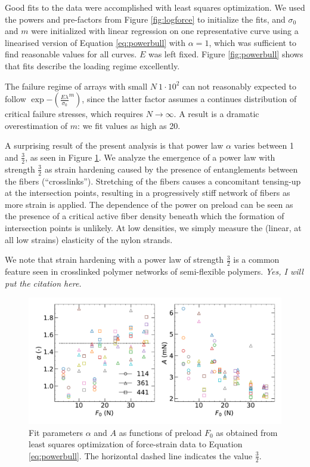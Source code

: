 \documentclass{article}
\begin{document}
Good fits to the data were accomplished with least squares optimization. We used the
powers and pre-factors from Figure \ref{fig:logforce} to initialize the fits, and $\sigma_0$ 
and $m$ were initialized with linear regression on one representative curve using a linearised
version of Equation \ref{eq:powerbull} with $\alpha=1$, which was sufficient to find 
reasonable values for all curves. $E$ was left fixed.  Figure \ref{fig:powerbull} shows that fits
describe the loading regime excellently. 

The failure regime of arrays with small $N~1\cdot10^2$ can not reasonably expected to follow
$\exp{-(\frac{E\lambda}{\sigma_0}^m)}$, since the latter factor assumes a continues distribution 
of critical failure stresses, which requires $N \to \infty$. A result is a dramatic overestimation
of $m$: we fit values as high as 20. 

A surprising result of the present analysis is that power law $\alpha$ varies between 
1 and $\frac{3}{2}$, as seen in Figure \ref{fig:fitpars}. We analyze the emergence 
of a power law with strength $\frac{3}{2}$ as strain hardening caused by the presence of
entanglements between the fibers (``crosslinks''). Stretching of the fibers causes
a concomitant tensing-up at the intersection points, resulting in a progressively 
stiff network of fibers as more strain is applied. The dependence of the power on preload
can be seen as the presence of a critical active fiber density beneath which the formation
of intersection points is unlikely. At low densities, we simply measure the (linear, at all
low strains) elasticity of the nylon strands.

We note that strain hardening with a power law of
strength $\frac{3}{2}$ is a common feature seen in crosslinked polymer networks of semi-flexible 
polymers. \textit{Yes, I will put the citation here.}

\begin{figure}
    \label{fig:fitpars}
    \includegraphics[width=0.9\linewidth]{powerbull_2panel.pdf}
    \caption{Fit parameters $\alpha$ and $A$ as functions of preload $F_0$ as obtained from
    least squares optimization of force-strain data to Equation \ref{eq:powerbull}. The horizontal
    dashed line indicates the value $\frac{3}{2}$.}
\end{figure}
\end{document}
